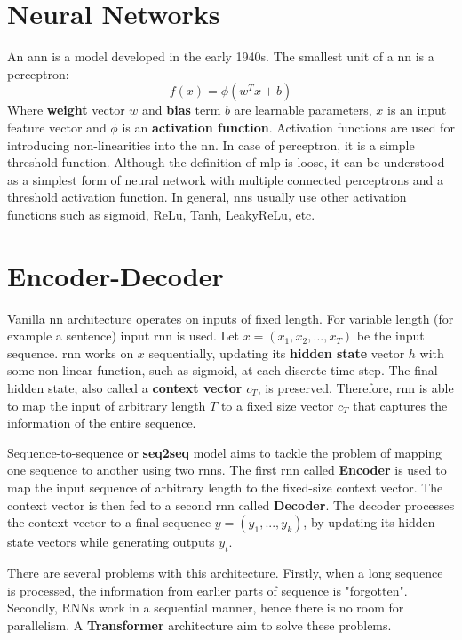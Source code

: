 \section{Neural Networks}
An \Gls{ann} is a model developed in the early 1940s. The smallest unit of a \Gls{nn} is a perceptron:
\begin{equation}
    f(x) = \phi(w^Tx + b)
\end{equation}
Where \textbf{weight} vector $w$ and \textbf{bias} term $b$ are learnable parameters, $x$ is an input feature vector and $\phi$ is an \textbf{activation function}. Activation functions are used for introducing non-linearities into the \Gls{nn}. In case of perceptron, it is a simple threshold function. Although the definition of \Gls{mlp} is loose, it can be understood as a simplest form of neural network with multiple connected perceptrons and a threshold activation function. In general, \Gls{nn}s usually use other activation functions such as sigmoid, ReLu, Tanh, LeakyReLu, etc.





\section{Encoder-Decoder}
Vanilla \Gls{nn} architecture operates on inputs of fixed length. For variable length (for example a sentence) input \Gls{rnn} is used. Let $x = (x_1,x_2,...,x_T)$ be the input sequence. \gls{rnn} works on $x$ sequentially, updating its \textbf{hidden state} vector $h$ with some non-linear function, such as sigmoid, at each discrete time step. The final hidden state, also called a \textbf{context vector} $c_T$, is preserved.
Therefore, \Gls{rnn} is able to map the input of arbitrary length $T$ to a fixed size vector $c_T$ that captures the information of the entire sequence.

Sequence-to-sequence \cite{sutskever2014sequence,cho2014learning} or \textbf{seq2seq} model aims to tackle the problem of mapping one sequence to another using two \Gls{rnn}s. The first \Gls{rnn} called \textbf{Encoder} is used to map the input sequence of arbitrary length to the fixed-size context vector. The context vector is then fed to a second \Gls{rnn} called \textbf{Decoder}. The decoder processes the context vector to a final sequence $y = (y_1,...,y_k)$, by updating its hidden state vectors while generating outputs $y_t$.

There are several problems with this architecture. Firstly, when a long sequence is processed, the information from earlier parts of sequence is "forgotten". Secondly, RNNs work in a sequential manner, hence there is no room for parallelism. A \textbf{Transformer} architecture aim to solve these problems.





